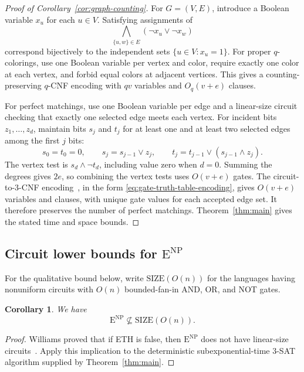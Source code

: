 \documentclass[11pt,reqno]{amsart}
\numberwithin{equation}{section}
\newtheorem{corollary}[theorem]{Corollary}
\theoremstyle{definition}\newtheorem{definition}[theorem]{Definition}
\theoremstyle{remark}\newtheorem{remark}[theorem]{Remark}
\begin{document}
\begin{proof}[Proof of Corollary~\ref{cor:graph-counting}]
For $G=(V,E)$, introduce a Boolean variable $x_u$ for each $u\in V$.
Satisfying assignments of
\[
 \bigwedge_{\{u,w\}\in E}(\neg x_u\vee\neg x_w)
\]
correspond bijectively to the independent sets $\{u\in V:x_u=1\}$.
For proper $q$-colorings, use one Boolean variable per vertex and
color, require exactly one color at each vertex, and forbid equal
colors at adjacent vertices. This gives a counting-preserving
$q$-CNF encoding with $qv$ variables and $O_q(v+e)$ clauses.

For perfect matchings, use one Boolean variable per edge and a
linear-size circuit checking that exactly one selected edge meets
each vertex. For incident bits $z_1,\ldots,z_d$, maintain bits
$s_j$ and $t_j$ for at least one and at least two selected edges
among the first $j$ bits:
\[
 s_0=t_0=0,\qquad
 s_j=s_{j-1}\vee z_j,\qquad
 t_j=t_{j-1}\vee(s_{j-1}\wedge z_j).
\]
The vertex test is $s_d\wedge\neg t_d$, including value zero when
$d=0$. Summing the degrees gives $2e$, so combining the vertex
tests uses $O(v+e)$ gates. The circuit-to-$3$-CNF
encoding~\cite[Lemmas~15.9--15.10]{Bar23}, in the form
\eqref{eq:gate-truth-table-encoding}, gives $O(v+e)$ variables
and clauses, with unique gate values for each accepted edge set.
It therefore preserves the number of perfect matchings.
Theorem~\ref{thm:main} gives the stated time and space bounds.
\end{proof}

\subsection{Circuit lower bounds for $\mathrm E^{\mathrm{NP}}$}\label{subsec:circuit-lower-bounds}
For the qualitative bound below, write $\mathrm{SIZE}(O(n))$ for the
languages having nonuniform circuits with $O(n)$ bounded-fan-in AND,
OR, and NOT gates.

\begin{corollary}\label{cor:consequence-circuits}
We have
\[
 \mathrm E^{\mathrm{NP}}\not\subseteq\mathrm{SIZE}(O(n)).
\]
\end{corollary}
\begin{proof}
Williams proved that if ETH is false, then
$\mathrm E^{\mathrm{NP}}$ does not have linear-size
circuits~\cite[Theorem~6.1]{Wil13}. Apply this implication to the
deterministic subexponential-time $3$-SAT algorithm supplied by
Theorem~\ref{thm:main}.
\end{proof}
\end{document}
